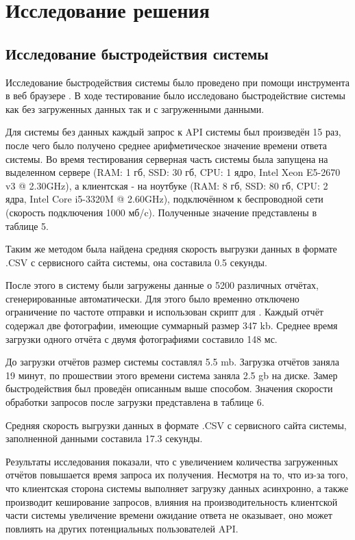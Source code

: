 
\section{Исследование решения}

\subsection{Исследование быстродействия системы}

\tab
Исследование быстродействия системы было проведено при помощи инструмента  в веб браузере . В ходе тестирование было исследовано быстродействие системы как без загруженных данных так и с загруженными данными.

\tab
Для системы без данных каждый запрос к API системы был произведён 15 раз, после чего было получено среднее арифметическое значение времени ответа системы.
Во время тестирования серверная часть системы была запущена на выделенном сервере (RAM: 1 гб, SSD: 30 гб, CPU: 1 ядро, Intel Xeon E5-2670 v3 @ 2.30GHz), а клиентская - на ноутбуке (RAM: 8 гб, SSD: 80 гб, CPU: 2 ядра, Intel Core i5-3320M @ 2.60GHz), подключённом к беспроводной сети (скорость подключения 1000 мб/c).
Полученные значение представлены в таблице 5.
\tablefive

\tab
Таким же методом была найдена средняя скорость выгрузки данных в формате .CSV с сервисного сайта системы, она составила 0.5 секунды.

\tab
После этого в систему были загружены данные о 5200 различных отчётах, сгенерированные автоматически.
Для этого было временно отключено ограничение по частоте отправки и использован скрипт для .
Каждый отчёт содержал две фотографии, имеющие суммарный размер 347 kb. Среднее время загрузки одного отчёта с двумя фотографиями составило 148 мс.

\tab
До загрузки отчётов размер системы составлял 5.5 mb.
Загрузка отчётов заняла 19 минут, по прошествии этого времени система заняла 2.5 gb на диске.
Замер быстродействия был проведён описанным выше способом.
Значения скорости обработки запросов после загрузки представлена в таблице 6.
\tablesix

\tab
Средняя скорость выгрузки данных в формате .CSV с сервисного сайта системы, заполненной данными составила 17.3 секунды.

\tab
Результаты исследования показали, что с увеличением количества загруженных отчётов повышается время запроса их получения.
Несмотря на то, что из-за того, что клиентская сторона системы выполняет загрузку данных асинхронно, а также производит кеширование запросов, влияния на производительность клиентской части системы увеличение времени ожидание ответа не оказывает, оно может повлиять на других потенциальных пользователей API.

